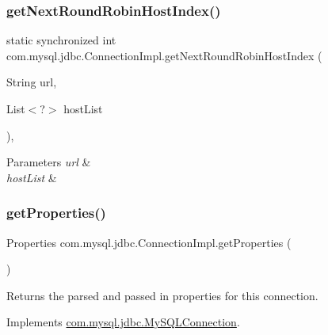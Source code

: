 \subsubsection{\texorpdfstring{get\+Next\+Round\+Robin\+Host\+Index()}{getNextRoundRobinHostIndex()}}
{\footnotesize\ttfamily static synchronized int com.\+mysql.\+jdbc.\+Connection\+Impl.\+get\+Next\+Round\+Robin\+Host\+Index (\begin{DoxyParamCaption}\item[{String}]{url,  }\item[{List$<$?$>$}]{host\+List }\end{DoxyParamCaption})\hspace{0.3cm}{\ttfamily [static]}, {\ttfamily [protected]}}


\begin{DoxyParams}{Parameters}
{\em url} & \\
\hline
{\em host\+List} & \\
\hline
\end{DoxyParams}
\mbox{\label{classcom_1_1mysql_1_1jdbc_1_1_connection_impl_a12d59167c09571dff544e96ff65b302b}} 
\subsubsection{\texorpdfstring{get\+Properties()}{getProperties()}}
{\footnotesize\ttfamily Properties com.\+mysql.\+jdbc.\+Connection\+Impl.\+get\+Properties (\begin{DoxyParamCaption}{ }\end{DoxyParamCaption})}

Returns the parsed and passed in properties for this connection. 

Implements \mbox{\hyperlink{interfacecom_1_1mysql_1_1jdbc_1_1_my_s_q_l_connection_a494cb1c438fb5e65b5fb9916c8331191}{com.\+mysql.\+jdbc.\+My\+S\+Q\+L\+Connection}}.

\mbox{\label{classcom_1_1mysql_1_1jdbc_1_1_connection_impl_ac6f97840677e30fabce87c044819e2c1}} 
